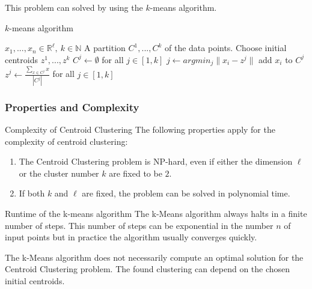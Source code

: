 \documentclass[english]{panikzettel}
\begin{document}
This problem can solved by using the $k$-means algorithm.

\begin{algo}{$k$-means algorithm}
{
\renewcommand{\algorithmicrequire}{\textbf{Input:}}
\renewcommand{\algorithmicensure}{\textbf{Output:}}
  \begin{algorithmic}[1]
  \Require $x_1,...,x_n\in\mathbb{R}^\ell, \ k\in\mathbb{N}$
  \Ensure A partition $C^1, ..., C^k$ of the data points.
  \State Choose initial centroids $z^1,...,z^k$ 
  \Repeat
  \State $C^j \leftarrow \emptyset$ for all $j\in [1,k]$
  	\State $j\leftarrow argmin_j \parallel x_i - z^j \parallel$ 
  	\State add $x_i$ to $C^j$
  \EndFor
  \State $z^j\leftarrow \frac{\sum_{x\in C^j}x}{|C^j|}$ for all $j\in [1,k]$
  \end{algorithmic}
}
\end{algo}

\subsubsection{Properties and Complexity}

\begin{theo}{Complexity of Centroid Clustering}
The following properties apply for the complexity of centroid clustering:
\begin{enumerate}
\item The Centroid Clustering problem is NP-hard, even if either the dimension $\ell$ or the cluster number $k$ are fixed to be $2$.
\item If both $k$ and $\ell$ are fixed, the problem can be solved in polynomial time.
\end{enumerate}
\end{theo}

\begin{theo}{Runtime of the k-means algorithm}
The k-Means algorithm always halts in a finite number of steps. This number of steps can be exponential in the number $n$ of input points but in practice the algorithm usually converges quickly.
\end{theo}

The k-Means algorithm does not necessarily compute an optimal solution for the Centroid Clustering problem. The found clustering can depend on the chosen initial centroids.
\end{document}
